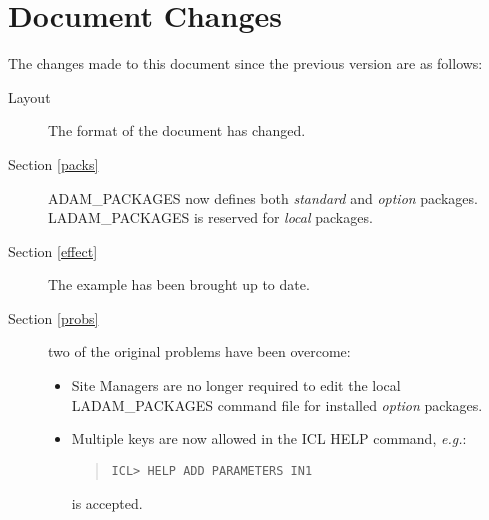\newpage
\appendix
\section{Document Changes}
\label{changes}
The changes made to this document since the previous version are as follows:
\begin{description}
\item[Layout] The format of the document has changed.
\item[Section \ref{packs}] ADAM\_PACKAGES now defines both {\em standard}\/ and
{\em option}\/ packages. LADAM\-\_PACK\-AGES is reserved for {\em local}\/
packages.
\item[Section \ref{effect}] The example has been brought up to date.
\item[Section \ref{probs}] two of the original problems have been overcome:
\begin{itemize}
\item Site Managers are no longer required to edit the local
LADAM\-\_PACK\-AGES command file for installed {\em option}\/ packages.
\item Multiple keys are now allowed in the ICL HELP command, {\em e.g.}:
\begin{quote} \begin{verbatim}
ICL> HELP ADD PARAMETERS IN1
\end{verbatim} \end{quote}
is accepted.
\end{itemize}
\end{description}


